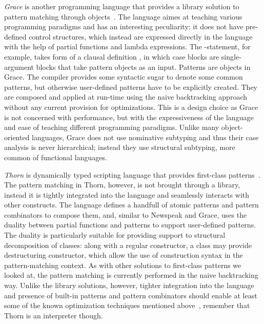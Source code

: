 \emph{Grace} is another programming language that provides a library solution to 
pattern matching through objects~\cite{Grace2012}. The language aimes at 
teaching various programming paradigms and has an interesting peculiarity: it 
does not have pre-defined control structures, which instead are expressed 
directly in the language with the help of partial functions and lambda 
expressions. The -statement, for example, takes form of a 
clausal definition , in which case 
blocks  are single-argument blocks that take pattern objects as 
an input. Patterns are objects in Grace. The compiler provides some syntactic 
sugar to denote some common patterns, but otherwise user-defined patterns have 
to be explicitly created. They are composed and applied at run-time using the 
naive backtracking approach without any current provision for optimizations. 
This is a design choice as Grace is not concerned with performance, but with the 
expressiveness of the language and ease of teaching different programming 
paradigms. Unlike many object-oriented languages, Grace does not use nominative 
subtyping and thus their case analysis is never hierarchical; instead they use 
structural subtyping, more common of functional languages.


\emph{Thorn} is dynamically typed scripting language that provides first-class 
patterns~\cite{Thorn2012}. The pattern matching in Thorn, however, is not 
brought through a library, instead it is tightly integrated into the language 
and seamlessly interacts with other constructs. The language defines a handfull 
of atomic patterns and pattern combinators to compose them, and, similar to 
Newspeak and Grace, uses the duality between partial functions and patterns to 
support user-defined patterns. The duality is particularly suitable for 
providing support to structural decomposition of classes: along with a regular 
constructor, a class may provide destructuring constructor, which allow the use 
of construction syntax in the pattern-matching context. As with other solutions 
to first-class patterns we looked at, the pattern matching is currently 
performed in the naive backtracking way. Unlike the library solutions, however, 
tighter integration into the language and presence of built-in patterns and 
pattern combinators should enable at least some of the known optimization 
techniques mentioned above~\cite{OPM01,Maranget08}, remember that Thorn is an 
interpreter though.

